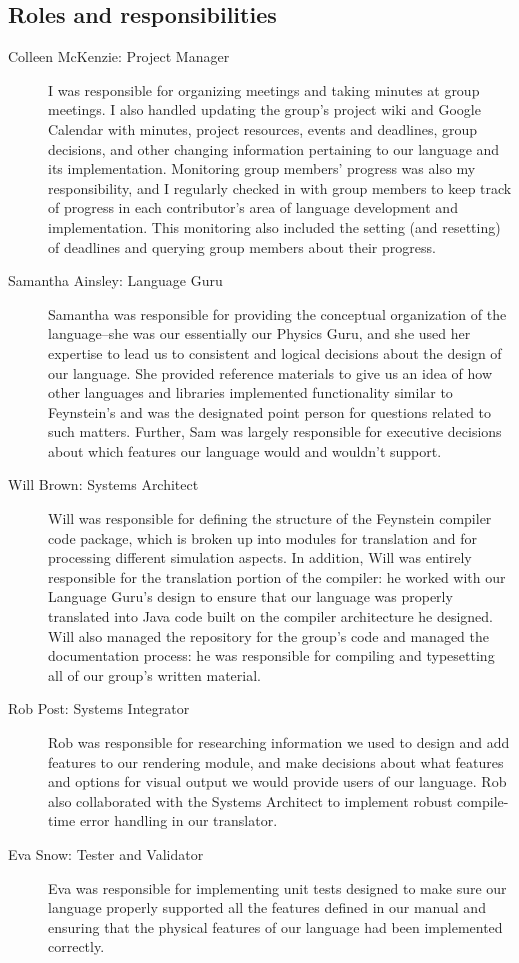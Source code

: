 \subsection{Roles and responsibilities}
\begin{description}
\item[Colleen McKenzie: Project Manager] I was responsible for
  organizing meetings and taking minutes at group meetings. I also
  handled updating the group’s project wiki and Google Calendar with
  minutes, project resources, events and deadlines, group decisions,
  and other changing information pertaining to our language and its
  implementation. Monitoring group members’ progress was also my
  responsibility, and I regularly checked in with group members to
  keep track of progress in each contributor’s area of language
  development and implementation. This monitoring also included the
  setting (and resetting) of deadlines and querying group members
  about their progress.

\item[Samantha Ainsley: Language Guru] Samantha was responsible for
  providing the conceptual organization of the language--she was our
  essentially our Physics Guru, and she used her expertise to lead us
  to consistent and logical decisions about the design of our
  language. She provided reference materials to give us an idea of how
  other languages and libraries implemented functionality similar to
  Feynstein’s and was the designated point person for questions
  related to such matters. Further, Sam was largely responsible for
  executive decisions about which features our language would and
  wouldn’t support.

\item[Will Brown: Systems Architect] Will was responsible for defining
  the structure of the Feynstein compiler code package, which is
  broken up into modules for translation and for processing different
  simulation aspects. In addition, Will was entirely responsible for
  the translation portion of the compiler: he worked with our Language
  Guru’s design to ensure that our language was properly translated
  into Java code built on the compiler architecture he designed. Will
  also managed the repository for the group’s code and managed the
  documentation process: he was responsible for compiling and
  typesetting all of our group's written material.

\item[Rob Post: Systems Integrator] Rob was responsible for
  researching information we used to design and add features to our
  rendering module, and make decisions about what features and options
  for visual output we would provide users of our language. Rob also
  collaborated with the Systems Architect to implement robust
  compile-time error handling in our translator.

\item[Eva Snow: Tester and Validator] Eva was responsible for
  implementing unit tests designed to make sure our language properly
  supported all the features defined in our manual and ensuring that
  the physical features of our language had been implemented
  correctly.
\end{description}

